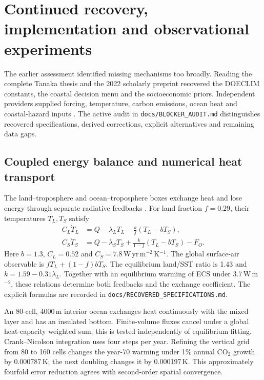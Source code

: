 \section{Continued recovery, implementation and observational experiments}
\label{sec:continuation}

The earlier assessment identified missing mechanisms too broadly. Reading the
complete Tanaka thesis and the 2022 scholarly preprint recovered the DOECLIM
constants, the coastal decision menu and the socioeconomic priors. Independent
providers supplied forcing, temperature, carbon emissions, ocean heat and
coastal-hazard inputs \cite{inputs}. The active audit in
\texttt{docs/BLOCKER\_AUDIT.md} distinguishes recovered specifications,
derived corrections, explicit alternatives and remaining data gaps.

\subsection{Coupled energy balance and numerical heat transport}

The land--troposphere and ocean--troposphere boxes exchange heat and lose energy
through separate radiative feedbacks \cite{tanaka,urban}. For land fraction
$f=0.29$, their temperatures $T_L,T_S$ satisfy
\begin{align}
C_L\dot T_L&=Q-\lambda_LT_L-\frac{k}{f}(T_L-bT_S),\\
C_S\dot T_S&=Q-\lambda_ST_S+\frac{k}{1-f}(T_L-bT_S)-F_O.
\end{align}
Here $b=1.3$, $C_L=0.52$ and $C_S=7.8$\,W\,yr\,m$^{-2}$\,K$^{-1}$.
The global surface-air observable is $fT_L+(1-f)bT_S$. The equilibrium land/SST
ratio is 1.43 and $k=1.59-0.31\lambda_L$. Together with an equilibrium warming
of ECS under 3.7\,W\,m$^{-2}$, these relations determine both feedbacks and the
exchange coefficient. The explicit formulas are recorded in
\texttt{docs/RECOVERED\_SPECIFICATIONS.md}.

An 80-cell, 4000\,m interior ocean exchanges heat continuously with the mixed
layer and has an insulated bottom. Finite-volume fluxes cancel under a global
heat-capacity weighted sum; this is tested independently of equilibrium fitting.
Crank--Nicolson integration uses four steps per year. Refining the vertical grid
from 80 to 160 cells changes the year-70 warming under 1\% annual CO$_2$ growth
by 0.000787\,K; the next doubling changes it by 0.000197\,K. This approximately
fourfold error reduction agrees with second-order spatial convergence.

